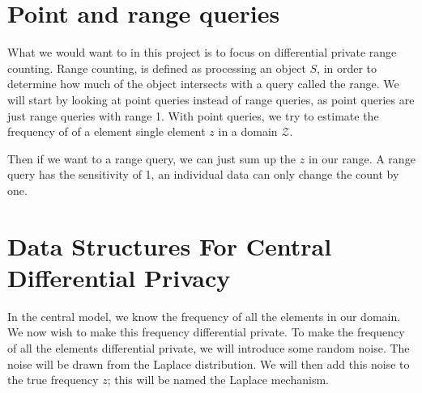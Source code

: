 \documentclass[11pt]{article}
\theoremstyle{definition}
\begin{document}
\section{Point and range queries}
What we would want to in this project is to focus on differential private range counting. Range counting, is defined as processing an object $S$, in order to determine how much of the object intersects with a query called the range. We will start by looking at point queries instead of range queries, as point queries are just range queries with range 1. With point queries, we try to estimate the frequency of of a element single element $z$ in a domain $\mathcal{Z}$. 

Then if we want to a range query, we can just sum up the $z$ in our range. A range query has the sensitivity of 1, an individual data can only change the count by one. 

\section{Data Structures For Central Differential Privacy}
In the central model, we know the frequency of all the elements in our domain. We now wish to make this frequency differential private. To make the frequency of all the elements differential private, we will introduce some random noise. The noise will be drawn from the Laplace distribution. We will then add this noise to the true frequency $z$; this will be named the Laplace mechanism.
\end{document}
